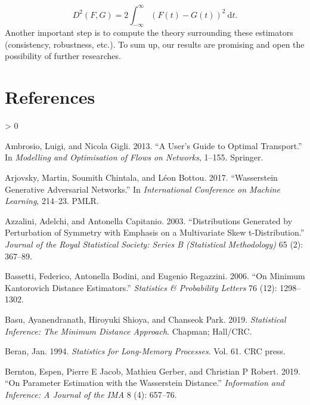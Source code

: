 \documentclass[
  11pt,
]{article}
\newlength{\cslhangindent}
\newenvironment{CSLReferences}[2] %
 {%
  \setlength{\parindent}{0pt}
  \ifodd #1 \everypar{\setlength{\hangindent}{\cslhangindent}}\ignorespaces\fi
  \ifnum #2 > 0
  \setlength{\parskip}{#2\baselineskip}
  \fi
 }%
 {}
\begin{document}
\[D^{2}(F, G)=2 \int_{-\infty}^{\infty}(F(t)-G(t))^{2} \mathrm{~d} t.\]
Another important step is to compute the theory surrounding these
estimators (consistency, robustness, etc.). To sum up, our results are
promising and open the possibility of further researches.

\newpage

\hypertarget{references}{%
\section*{References}\label{references}}

\hypertarget{refs}{}
\begin{CSLReferences}{1}{0}
\leavevmode\hypertarget{ref-ambrosio2013user}{}%
Ambrosio, Luigi, and Nicola Gigli. 2013. {``A User's Guide to Optimal
Transport.''} In \emph{Modelling and Optimisation of Flows on Networks},
1--155. Springer.

\leavevmode\hypertarget{ref-arjovsky2017wasserstein}{}%
Arjovsky, Martin, Soumith Chintala, and Léon Bottou. 2017.
{``Wasserstein Generative Adversarial Networks.''} In
\emph{International Conference on Machine Learning}, 214--23. PMLR.

\leavevmode\hypertarget{ref-azzalini2003distributions}{}%
Azzalini, Adelchi, and Antonella Capitanio. 2003. {``Distributions
Generated by Perturbation of Symmetry with Emphasis on a Multivariate
Skew t-Distribution.''} \emph{Journal of the Royal Statistical Society:
Series B (Statistical Methodology)} 65 (2): 367--89.

\leavevmode\hypertarget{ref-bassetti2006minimum}{}%
Bassetti, Federico, Antonella Bodini, and Eugenio Regazzini. 2006. {``On
Minimum Kantorovich Distance Estimators.''} \emph{Statistics \&
Probability Letters} 76 (12): 1298--1302.

\leavevmode\hypertarget{ref-basu2019statistical}{}%
Basu, Ayanendranath, Hiroyuki Shioya, and Chanseok Park. 2019.
\emph{Statistical Inference: The Minimum Distance Approach}. Chapman;
Hall/CRC.

\leavevmode\hypertarget{ref-beran1994statistics}{}%
Beran, Jan. 1994. \emph{Statistics for Long-Memory Processes}. Vol. 61.
CRC press.

\leavevmode\hypertarget{ref-bernton2019parameter}{}%
Bernton, Espen, Pierre E Jacob, Mathieu Gerber, and Christian P Robert.
2019. {``On Parameter Estimation with the Wasserstein Distance.''}
\emph{Information and Inference: A Journal of the IMA} 8 (4): 657--76.



\end{CSLReferences}
\end{document}

